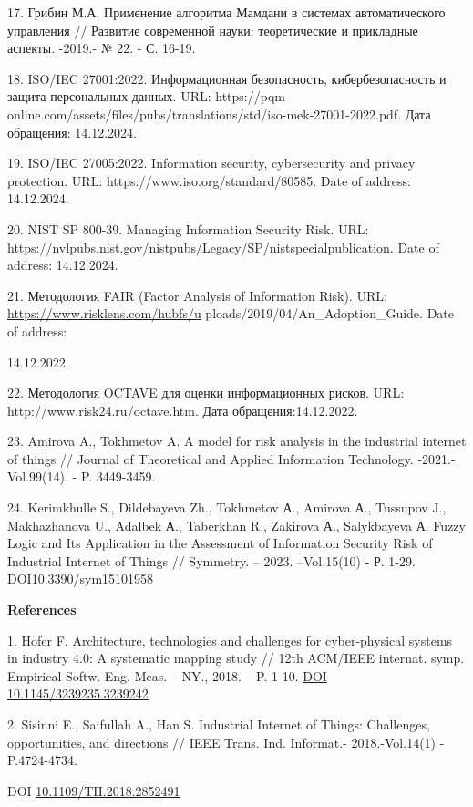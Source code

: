 \documentclass[
]{article}
\begin{document}
17. Грибин М.А. Применение алгоритма Мамдани в системах автоматического
управления // Развитие современной науки: теоретические и прикладные
аспекты. -2019.- № 22. - С. 16-19.

18. ISO/IEC 27001:2022. Информационная безопасность, кибербезопасность и
защита персональных данных. URL:
https://pqm-online.com/assets/files/pubs/translations/std/iso-mek-27001-2022.pdf.
Дата обращения: 14.12.2024.

19. ISO/IEC 27005:2022. Information security, cybersecurity and privacy
protection. URL: https://www.iso.org/standard/80585. Date of address:
14.12.2024.

20. NIST SP 800-39. Managing Information Security Risk. URL:
https://nvlpubs.nist.gov/nistpubs/Legacy/SP/nistspecialpublication. Date
of address: 14.12.2024.

21. Методология FAIR (Factor Analysis of Information Risk). URL:
\url{https://www.risklens.com/hubfs/u}
ploads/2019/04/An\_Adoption\_Guide. Date of address:

14.12.2022.

22. Методология OCTAVE для оценки информационных рисков. URL:
http://www.risk24.ru/octave.htm. Дата обращения:14.12.2022.

23. Amirova A., Tokhmetov A. A model for risk analysis in the industrial
internet of things // Journal of Theoretical and Applied Information
Technology. -2021.- Vol.99(14). - P. 3449-3459.

24. Kerimkhulle S., Dildebayeva Zh., Tokhmetov А., Amirova А., Tussupov
J., Makhazhanova U., Adalbek А., Taberkhan R., Zakirova А., Salykbayeva
А. Fuzzy Logic and Its Application in the Assessment of Information
Security Risk of Industrial Internet of Things // Symmetry. -- 2023.
--Vol.15(10) - Р. 1-29. DOI10.3390/sym15101958

\textbf{References}

1. Hofer F. Architecture, technologies and challenges for cyber-physical
systems in industry 4.0: A systematic mapping study // 12th ACM/IEEE
internat. symp. Empirical Softw. Eng. Meas. -- NY., 2018. -- P. 1-10.
\href{https://doi.org/10.1145/3239235.3239242}{DOI
10.1145/3239235.3239242}

2. Sisinni E., Saifullah A., Han S. Industrial Internet of Things:
Challenges, opportunities, and directions // IEEE Trans. Ind. Informat.-
2018.-Vol.14(1) - P.4724-4734.

DOI
\href{https://doi.org/10.1109/TII.2018.2852491}{10.1109/TII.2018.2852491}
\end{document}
